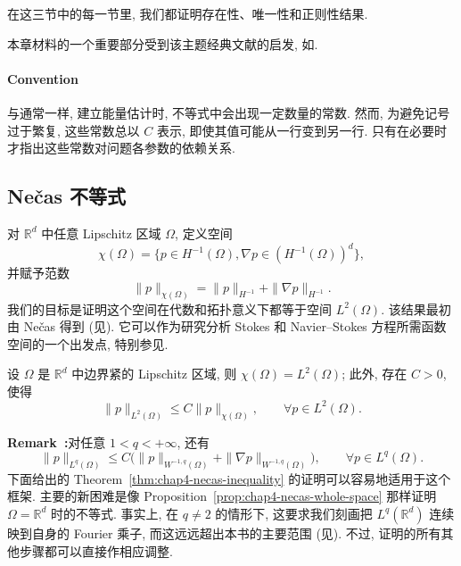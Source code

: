 在这三节中的每一节里, 我们都证明存在性、唯一性和正则性结果.

本章材料的一个重要部分受到该主题经典文献的启发, 如.

\paragraph{Convention}

与通常一样, 建立能量估计时, 不等式中会出现一定数量的常数. 然而, 为避免记号过于繁复, 这些常数总以 $C$ 表示, 即使其值可能从一行变到另一行. 只有在必要时才指出这些常数对问题各参数的依赖关系.

\subsection{Nečas 不等式}
\label{sec:chap4-necas-inequality}

对 $\mathbb R^d$ 中任意 Lipschitz 区域 $\Omega$, 定义空间
\[
 \chi(\Omega)=\{p\in H^{-1}(\Omega),\nabla p\in(H^{-1}(\Omega))^d\},
\]
并赋予范数
\[
 \|p\|_{\chi(\Omega)}=\|p\|_{H^{-1}}+\|\nabla p\|_{H^{-1}}.
\]
我们的目标是证明这个空间在代数和拓扑意义下都等于空间 $L^2(\Omega)$. 该结果最初由 Nečas 得到 (见). 它可以作为研究分析 Stokes 和 Navier--Stokes 方程所需函数空间的一个出发点, 特别参见.

\begin{Theorem}
\label{thm:chap4-necas-inequality}
设 $\Omega$ 是 $\mathbb R^d$ 中边界紧的 Lipschitz 区域, 则 $\chi(\Omega)=L^2(\Omega)$; 此外, 存在 $C>0$, 使得
\begin{equation}
 \|p\|_{L^2(\Omega)}\leq C\|p\|_{\chi(\Omega)},
 \qquad\forall p\in L^2(\Omega).
 \label{eq:chap4-necas-inequality}
\end{equation}
\end{Theorem}

\par\noindent{}\textbf{Remark~\thechapterfoursectiononeremark:}\label{rem:chap4-necas-lq-version}\quad 对任意 $1<q<+\infty$, 还有
\[
 \|p\|_{L^q(\Omega)}
 \leq C\bigl(\|p\|_{W^{-1,q}(\Omega)}+\|\nabla p\|_{W^{-1,q}(\Omega)}\bigr),
 \qquad\forall p\in L^q(\Omega).
\]
下面给出的 Theorem~\ref{thm:chap4-necas-inequality} 的证明可以容易地适用于这个框架. 主要的新困难是像 Proposition~\ref{prop:chap4-necas-whole-space} 那样证明 $\Omega=\mathbb R^d$ 时的不等式. 事实上, 在 $q\neq2$ 的情形下, 这要求我们刻画把 $L^q(\mathbb R^d)$ 连续映到自身的 Fourier 乘子, 而这远远超出本书的主要范围 (见). 不过, 证明的所有其他步骤都可以直接作相应调整.

